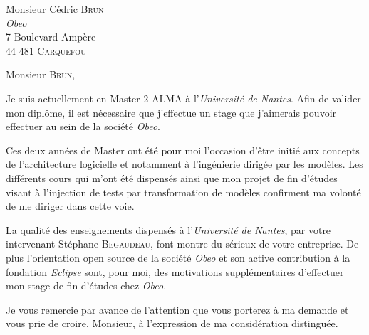 \documentclass{lettre}
\makeatletter
\newcommand*{\NoRule}{\renewcommand*{\rule@length}{0}}
\makeatother
\begin{document}
 
\begin{letter}{Monsieur Cédric \textsc{Brun}\\
\emph{Obeo}\\7 Boulevard Ampère\\44 481 \textsc{Carquefou}
 }
\francais
\pagestyle{headings}

\renewcommand{\vrefname}{\hspace{-2.4cm}\small Réf. :~\No~\'Etudiant~} %
\renewcommand{\nrefname}{} %

\signature{Romain \textsc{Rincé}}
\address{Romain \textsc{Rincé}\\5 Place du Bouffay\\44000 \textsc{Nantes}}

\nofax
\NoRule
\def\concname{\hspace{-2.4cm}\small Objet :~} %
\opening{Monsieur \textsc{Brun},}
 \vspace{0.5cm}
 Je suis actuellement en Master 2 \textsc{ALMA} à l'\emph{Université de Nantes}. Afin de valider mon diplôme, il est nécessaire que j'effectue un stage que j'aimerais pouvoir effectuer au sein de la société \emph{Obeo}.
 
 Ces deux années de Master ont été pour moi l'occasion d'être initié aux concepts de l'architecture logicielle et notamment à l'ingénierie dirigée par les modèles. Les différents cours qui m'ont été dispensés ainsi que mon projet de fin d'études visant à l'injection de tests par transformation de modèles confirment ma volonté de me diriger dans cette voie.
 
 La qualité des enseignements dispensés à  l'\emph{Université de Nantes}, par votre intervenant Stéphane \textsc{Begaudeau}, font montre du sérieux de votre entreprise. De plus l'orientation open source de la société \emph{Obeo} et son active contribution à la fondation \emph{Eclipse} sont, pour moi, des motivations supplémentaires d'effectuer mon stage de fin d'études chez \emph{Obeo}. 
  
 \closing{Je vous remercie par avance de l’attention que vous porterez à ma demande et vous prie de
croire, Monsieur, à l’expression de ma considération distinguée.}

 
\end{letter}
 
\end{document}
